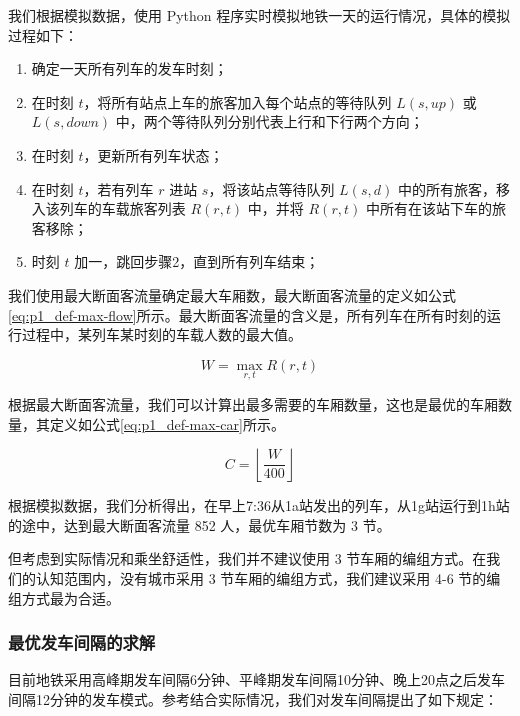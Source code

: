 \documentclass[12pt,a4paper]{mcmthesis}
\begin{document}
    我们根据模拟数据，使用 Python 程序实时模拟地铁一天的运行情况，具体的模拟过程如下：

    \begin{enumerate}
        \item 确定一天所有列车的发车时刻；
        \item 在时刻 $t$，将所有站点上车的旅客加入每个站点的等待队列 $L(s,up)$ 或 $L(s,down)$ 中，两个等待队列分别代表上行和下行两个方向；
        \item 在时刻 $t$，更新所有列车状态；
        \item 在时刻 $t$，若有列车 $r$ 进站 $s$，将该站点等待队列 $L(s,d)$ 中的所有旅客，移入该列车的车载旅客列表 $R(r,t)$ 中，并将 $R(r,t)$ 中所有在该站下车的旅客移除；
        \item 时刻 $t$ 加一，跳回步骤2，直到所有列车结束；
    \end{enumerate}

    我们使用最大断面客流量确定最大车厢数，最大断面客流量的定义如公式\ref{eq:p1_def-max-flow}所示。最大断面客流量的含义是，所有列车在所有时刻的运行过程中，某列车某时刻的车载人数的最大值。\cite{断面客流}

    \begin{equation}
        W = \max_{r,t} R(r,t)
        \label{eq:p1_def-max-flow}
    \end{equation}

    根据最大断面客流量，我们可以计算出最多需要的车厢数量，这也是最优的车厢数量，其定义如公式\ref{eq:p1_def-max-car}所示。

    \begin{equation}
        C = \left\lfloor \frac{W}{400} \right\rfloor
        \label{eq:p1_def-max-car}
    \end{equation}

    根据模拟数据，我们分析得出，在早上7:36从1a站发出的列车，从1g站运行到1h站的途中，达到最大断面客流量 852 人，最优车厢节数为 3 节。

    但考虑到实际情况和乘坐舒适性，我们并不建议使用 3 节车厢的编组方式。在我们的认知范围内，没有城市采用 3 节车厢的编组方式，我们建议采用 4-6 节的编组方式最为合适。

    \subsubsection{最优发车间隔的求解}

    目前地铁采用高峰期发车间隔6分钟、平峰期发车间隔10分钟、晚上20点之后发车间隔12分钟的发车模式。参考\cite{发车间距}结合实际情况，我们对发车间隔提出了如下规定：
\end{document}

